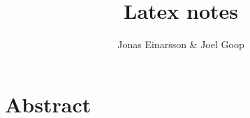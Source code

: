 \documentclass[11pt,a4paper,notitlepage]{article}
\begin{document}
\pagestyle{plain}

\setcounter{page}{1}

\title{Latex notes}
\author{Jonas Einarsson \& Joel Goop}
\maketitle

\setdefaulthdr
{}	
\setcounter{page}{1}

\section{Abstract}
\end{document}
